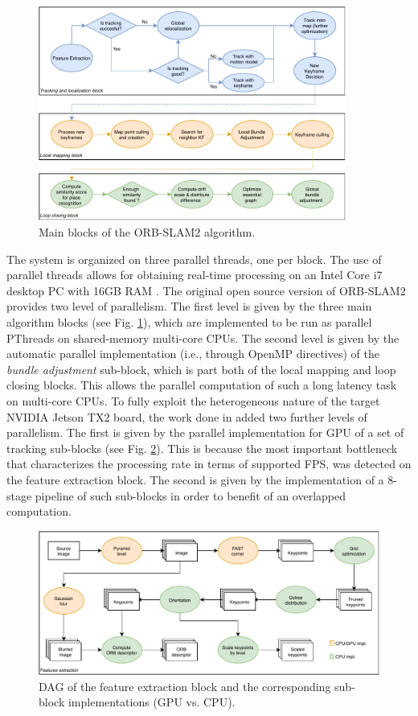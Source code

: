\begin{figure}
	\centering
	\includegraphics[width=0.90\textwidth]{images/orb-slam-overview2.pdf}
	\caption{Main blocks of the ORB-SLAM2 algorithm.}
	\label{fig:orbslam}
\end{figure}


The system is organized on three parallel threads, one per block. The use of parallel threads allows for obtaining real-time processing on an Intel Core i7 desktop PC with 16GB RAM \cite{murORB2}. The original open source version of ORB-SLAM2 provides two level of parallelism. The first level is given by the three main algorithm blocks (see Fig. \ref{fig:orbslam}), which are implemented to be run as parallel PThreads on shared-memory multi-core CPUs. The second level is given by the automatic parallel implementation (i.e., through OpenMP directives) of the \textit{bundle adjustment} sub-block, which is part both of the local mapping and loop closing blocks. This allows the parallel computation of such a long latency task on multi-core CPUs.
To fully exploit the heterogeneous nature of the target NVIDIA Jetson TX2 board, the work done in \cite{iros2019} added two further levels of parallelism. The first is given by the parallel implementation for GPU of a set of tracking sub-blocks (see Fig. \ref{FIG:FE-DAG}). This is because the most important bottleneck that characterizes the processing rate in terms of supported FPS, was detected on the feature extraction block. The second is given by the implementation of a 8-stage pipeline of such sub-blocks in order to benefit of an overlapped computation.

\begin{figure}[t!]
	\centering
	\includegraphics[width=\linewidth]{images/orb_feature.pdf}
	\caption{DAG of the feature extraction block and the corresponding sub-block implementations (GPU vs. CPU).}\label{FIG:FE-DAG}
\end{figure}



